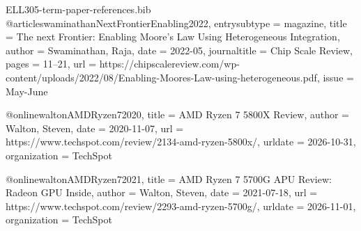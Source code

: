 \begin{filecontents*}[overwrite]{ELL305-term-paper-references.bib}
@article{swaminathanNextFrontierEnabling2022,
  entrysubtype = {magazine},
  title = {The next Frontier: {{Enabling Moore}}'s {{Law}} Using Heterogeneous Integration},
  author = {Swaminathan, Raja},
  date = {2022-05},
  journaltitle = {Chip Scale Review},
  pages = {11--21},
  url = {https://chipscalereview.com/wp-content/uploads/2022/08/Enabling-Moores-Law-using-heterogeneous.pdf},
  issue = {May-June}
}

@online{waltonAMDRyzen72020,
  title = {{{AMD Ryzen}} 7 {{5800X Review}}},
  author = {Walton, Steven},
  date = {2020-11-07},
  url = {https://www.techspot.com/review/2134-amd-ryzen-5800x/},
  urldate = {2026-10-31},
  organization = {TechSpot}
}

@online{waltonAMDRyzen72021,
  title = {{{AMD Ryzen}} 7 {{5700G APU Review}}: {{Radeon GPU Inside}}},
  author = {Walton, Steven},
  date = {2021-07-18},
  url = {https://www.techspot.com/review/2293-amd-ryzen-5700g/},
  urldate = {2026-11-01},
  organization = {TechSpot}
}


\end{filecontents*}
